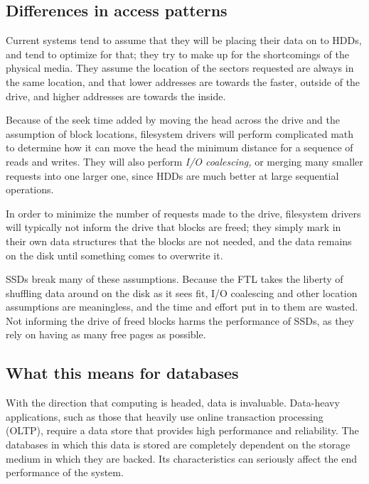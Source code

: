 \documentclass[format=acmsmall, review=false, screen=true]{acmart}
\begin{document}
\subsection{Differences in access patterns}

Current systems tend to assume that they will be placing their data on to HDDs, and tend to optimize for that; they try 
to make up for the shortcomings of the physical media. They assume the location of the sectors requested are always in 
the same location, and that lower addresses are towards the faster, outside of the drive, and higher addresses are towards 
the inside. \cite{Cornwell2012}

Because of the seek time added by moving the head across the drive and the assumption of block locations, filesystem drivers 
will perform complicated math to determine how it can move the head the minimum distance for a sequence of reads and writes. 
They will also perform \textit{I/O coalescing,} or merging many smaller requests into one larger one, since HDDs are much 
better at large sequential operations. \cite{Cornwell2012}

In order to minimize the number of requests made to the drive, filesystem drivers will typically not inform the drive that 
blocks are freed; they simply mark in their own data structures that the blocks are not needed, and the data remains on 
the disk until something comes to overwrite it. \cite{Cornwell2012}

SSDs break many of these assumptions. Because the FTL takes the liberty of shuffling data around on the disk as it sees 
fit, I/O coalescing and other location assumptions are meaningless, and the time and effort put in to them are wasted. 
Not informing the drive of freed blocks harms the performance of SSDs, as they rely on having as many free pages as 
possible. \cite{Cornwell2012, Micheloni2013, MatejFucek2014}

\subsection{What this means for databases}

With the direction that computing is headed, data is invaluable. Data-heavy applications, such as those that heavily use 
online transaction processing (OLTP), require a data store that provides high performance and reliability.  The databases 
in which this data is stored are completely dependent on the storage medium in which they are backed. Its characteristics 
can seriously affect the end performance of the system. \cite{Lee2009, Xie2011, Micheloni2013, MatejFucek2014, Chen2016}
\end{document}
